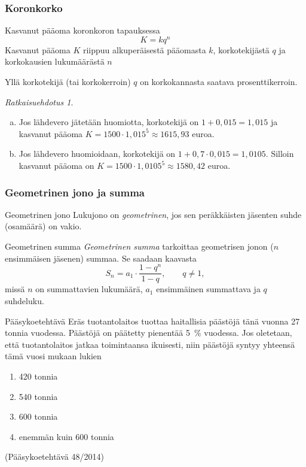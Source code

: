\documentclass[]{beamer}\usepackage[]{graphicx}\usepackage[]{color}
\theoremstyle{remark}
\newtheorem{ratkaisu}{Ratkaisuehdotus}
\begin{document}
\begin{frame}
\frametitle{Koronkorko}
	\begin{block}{Kasvanut pääoma koronkoron tapauksessa}
		\[
			K = kq^n
		\]
		Kasvanut pääoma \(K\) riippuu alkuperäisestä pääomasta \(k\), korkotekijästä \(q\) ja korkokausien lukumäärästä \(n\)
	\end{block}
	Yllä korkotekijä (tai korkokerroin) \(q\) on korkokannasta saatava prosenttikerroin.
\end{frame}

\begin{frame}
 	\begin{ratkaisu}
 		\begin{enumerate}[(a)]
 			\item Jos lähdevero jätetään huomiotta, korkotekijä on \(1+ 0,015 = 1,015\) ja kasvanut pääoma
 			\(K=1500\cdot1,015^5\approx 1615,93\) euroa.
 			\item Jos lähdevero huomioidaan, korkotekijä on \(1+0,7\cdot0,015=	1,0105\). Silloin kasvanut pääoma on
 			\(K=1500\cdot1,0105^5\approx	1580,42\) euroa.
 		\end{enumerate}
 	\end{ratkaisu}
\end{frame}

\begin{frame}
    \frametitle{Geometrinen jono ja summa}
    \pause
    \begin{block}{Geometrinen jono}
        Lukujono on \emph{geometrinen}, jos sen peräkkäisten jäsenten suhde (osamäärä) on vakio.
    \end{block}
    \pause
    \begin{block}{Geometrinen summa}
        \emph{Geometrinen summa} tarkoittaa geometrisen jonon ($n$ ensimmäisen jäsenen) summaa. Se saadaan kaavasta
        \[
            S_n = a_1\cdot \frac{1-q^n}{1-q}, \qquad q\neq 1,
        \] \pause
        missä \(n\) on summattavien lukumäärä,
        \pause \(a_1\) ensimmäinen summattava
        \pause ja \(q\) suhdeluku.
    \end{block}
\end{frame}

\begin{frame}
  \begin{block}{Pääsykoetehtävä}
    Eräs tuotantolaitos tuottaa haitallisia päästöjä tänä vuonna 27 tonnia vuodessa.
Päästöjä on päätetty pienentää 5~\% vuodessa. Jos oletetaan, että tuotantolaitos jatkaa
toimintaansa ikuisesti, niin päästöjä syntyy yhteensä tämä vuosi mukaan lukien
    \begin{enumerate}
      \item 420 tonnia
      \item 540 tonnia
      \item 600 tonnia
      \item enemmän kuin 600 tonnia
    \end{enumerate}
    (Pääsykoetehtävä 48/2014)
  \end{block}
\end{frame}
\end{document}

